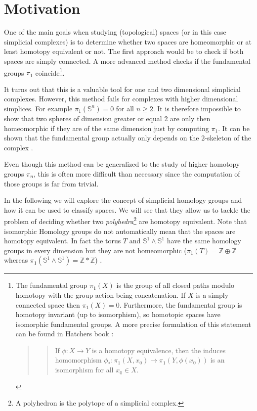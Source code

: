 \documentclass[toc=bib, headinclude]{scrartcl}
\theoremstyle{plain}
\theoremstyle{definition}
\theoremstyle{remark}
\newcommand{\sh}{simplicial homology}
\newcommand{\Z}{\mathbb{Z}}
\newcommand{\scs}{simplicial complexes}
\begin{document}
\section{Motivation}\label{motivation}
One of the main goals when studying (topological) spaces (or in this case \scs) is to determine whether two spaces are homeomorphic or at least homotopy equivalent 
or not. The first approach would be to check if both spaces are simply connected. A more advanced method checks if the fundamental groups $\pi_1$ coincide\footnote{The fundamental group $\pi_1(X)$ is the group of all closed paths modulo homotopy with the group action being concatenation. If $X$ is a simply connected space then $\pi_1(X)=0$. Furthermore, the fundamental group is homotopy invariant (up to isomorphism), so homotopic spaces have isomorphic fundamental groups. A more precise formulation of this statement can be found in Hatchers book \parencite[Prop. 1.18, p. 37]{ha}:
\begin{quotation}
	\begin{quote}
		If $\phi: X\to Y$ is a homotopy equivalence, then the induces homomorphism $\phi_*:\pi_1(X,x_0)\to\pi_1(Y,\phi(x_0))$ is an isomorphism for all $x_0\in X$.
	\end{quote}
\end{quotation} }.

It turns out that this is a valuable tool for one and two dimensional \scs. However, this method fails for complexes with higher dimensional simplices. For example $\pi_1(\mathbb{S}^n)=0$ for all $n\geq 2$. It is therefore impossible to show that two spheres of dimension greater or equal 2 are only then homeomorphic if they are of the same dimension just by computing $\pi_1$. It can be shown that the fundamental group actually only depends on the 2-skeleton of the complex \cite[vgl.][p. 173]{ar}. 

Even though this method can be generalized to the study of higher homotopy groups $\pi_n$, this is often more difficult than necessary since the computation of those groups is far from trivial.

In the following we will explore the concept of \sh{} groups and how it can be used to classify spaces. We will see that they allow us to tackle the problem of deciding whether two \textit{polyhedra}\footnote{A polyhedron is the polytope of a simplicial complex.} are homotopy equivalent. Note that isomorphic Homology groups do not automatically mean that the spaces are homotopy equivalent. In fact the torus $T$ and $\mathbb{S}^1\wedge\mathbb{S}^1$ have the same homology groups in every dimension but they are not homeomorphic ($\pi_1(T)=\Z\oplus\Z$ whereas $\pi_1(\mathbb{S}^1\wedge\mathbb{S}^1)=\Z\ast\Z$) .
\end{document}
